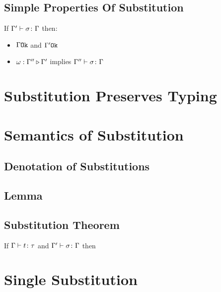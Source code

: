 \documentclass{report}
\begin{document}
\subsection{Simple Properties Of Substitution}
If $\Gamma' \vdash \sigma \colon \Gamma$ then:
\begin{itemize}
    \item $\Gamma \texttt{Ok}$ and $\Gamma' \texttt{Ok}$
    \item $\omega : \Gamma'' \triangleright \Gamma'$ implies $\Gamma'' \vdash \sigma \colon \Gamma$
\end{itemize}

\section{Substitution Preserves Typing}
\section{Semantics of Substitution}
\subsection{Denotation of Substitutions}
\subsection{Lemma}
\subsection{Substitution Theorem}

If $\Gamma \vdash t \colon \tau$ and $\Gamma' \vdash \sigma \colon \Gamma$ then
\section{Single Substitution}    
\end{document}
